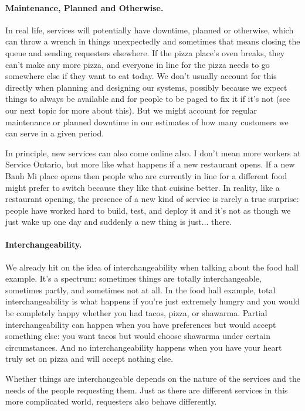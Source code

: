 \paragraph{Maintenance, Planned and Otherwise.}
In real life, services will potentially have downtime, planned or otherwise, which can throw a wrench in things unexpectedly and sometimes that means closing the queue and sending requesters elsewhere. If the pizza place's oven breaks, they can't make any more pizza, and everyone in line for the pizza needs to go somewhere else if they want to eat today. We don't usually account for this directly when planning and designing our systems, possibly because we expect things to always be available and for people to be paged to fix it if it's not (see our next topic for more about this). But we might account for regular maintenance or planned downtime in our estimates of how many customers we can serve in a given period.

In principle, new services can also come online also. I don't mean more workers at Service Ontario, but more like what happens if a new restaurant opens. If a new Banh Mi place opens then people who are currently in line for a different food might prefer to switch because they like that cuisine better. In reality, like a restaurant opening, the presence of a new kind of service is rarely a true surprise: people have worked hard to build, test, and deploy it and it's not as though we just wake up one day and suddenly a new thing is just... there.

\paragraph{Interchangeability.} We already hit on the idea of interchangeability when talking about the food hall example. It's a spectrum: sometimes things are totally interchangeable, sometimes partly, and sometimes not at all. In the food hall example, total interchangeability is what happens if you're just extremely hungry and you would be completely happy whether you had tacos, pizza, or shawarma.  Partial interchangeability can happen when you have preferences but would accept something else: you want tacos but would choose shawarma under certain circumstances. And no interchangeability happens when you have your heart truly set on pizza and will accept nothing else.

Whether things are interchangeable depends on the nature of the services and the needs of the people requesting them. Just as there are different services in this more complicated world, requesters also behave differently.

